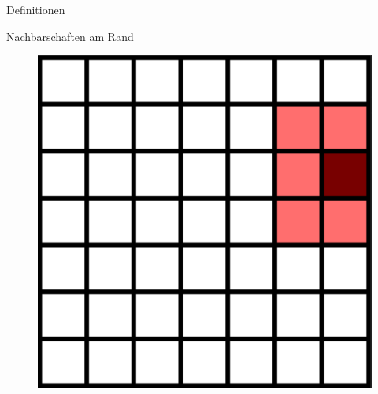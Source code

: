 \documentclass[aspectratio=169]{beamer}
\begin{document}
\begin{frame}{Definitionen}
\begin{multicols*}{2}
\begin{multicols*}{2}
      \end{multicols*}


      \vfill\null

    \end{multicols*}

  \end{frame}



  \begin{frame}{Nachbarschaften am Rand}


    \begin{multicols*}{5}

      \begin{figure}[H]
        \centering
        \includegraphics[width = 0.25 \textheight]{neighborhood_border_sol1.png}
      \end{figure}

      \vfill\null

      \centering{\Huge $\leftarrow$ \par}
      \vfill\null


\end{multicols*}
\end{frame}
\end{document}
